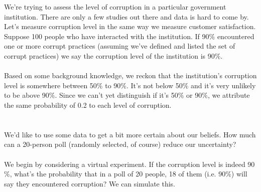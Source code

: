 \documentclass{article}
\begin{document}
We{'}re trying to assess the level of corruption in a particular government institution. There are only a few studies out there and data is hard
to come by. Let{'}s measure corruption level in the same way we measure customer satisfaction. Suppose 100 people who have interacted with the institution.
If 90$\%$ encountered one or more corrupt practices (assuming we{'}ve defined and listed the set of corrupt practices) we say the corruption level
of the institution is 90$\%$.\\
\\
Based on some background knowledge, we reckon that the institution{'}s corruption level is somewhere between 50$\%$ to 90$\%$. It{'}s not below 50$\%$
and it{'}s very unlikely to be above 90$\%$. Since we can{'}t yet distinguish if it{'}s 50$\%$ or 90$\%$, we attribute the same probability of 0.2
to each level of corruption. \\
\\
\\
We{'}d like to use some data to get a bit more certain about our beliefs. How much can a 20-person poll (randomly selected, of course) reduce our
uncertainty?\\
\\
We begin by considering a virtual experiment. If the corruption level is indeed 90$\%$, what{'}s the probability that in a poll of 20 people, 18
of them (i.e. 90$\%$) will say they encountered corruption? We can simulate this.
\end{document}
